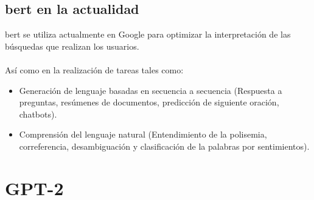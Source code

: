 \documentclass[12pt, a4paper, titlepage]{report}
\begin{document}
		        \subsection{\acrshort{bert} en la actualidad}
		        
		        \acrshort{bert} se utiliza actualmente en Google para optimizar la interpretación de las búsquedas que realizan los usuarios.\\\\
		        Así como en la realización de tareas tales como: \cite{refBertactualidad}
		        \begin{itemize}
		        	\item Generación de lenguaje basadas en secuencia a secuencia (Respuesta a preguntas, resúmenes de documentos, predicción de siguiente oración, chatbots). 
		        	\item Comprensión del lenguaje natural (Entendimiento de la polisemia, correferencia, desambiguación y clasificación de la palabras por sentimientos).
		        \end{itemize}         
       
        \section{GPT-2}
\end{document}
